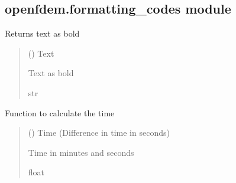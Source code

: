 \documentclass[letterpaper,10pt,english]{sphinxmanual}
\begin{document}
\subsection{openfdem.formatting\_codes module}
\label{\detokenize{openfdem:module-openfdem.formatting_codes}}\label{\detokenize{openfdem:openfdem-formatting-codes-module}}

\begin{fulllineitems}
\label{\detokenize{openfdem:openfdem.formatting_codes.bold_text}}
\pysigstartsignatures
{}
\pysigstopsignatures
\sphinxAtStartPar
Returns text as bold
\begin{quote}\begin{description}
\sphinxAtStartPar
{} () \textendash{} Text

\sphinxAtStartPar
Text as bold

\sphinxAtStartPar
str

\end{description}\end{quote}

\end{fulllineitems}


\begin{fulllineitems}
\label{\detokenize{openfdem:openfdem.formatting_codes.calc_timer_values}}
\pysigstartsignatures
{}
\pysigstopsignatures
\sphinxAtStartPar
Function to calculate the time
\begin{quote}\begin{description}
\sphinxAtStartPar
{} () \textendash{} Time (Difference in time in seconds)

\sphinxAtStartPar
Time in minutes and seconds

\sphinxAtStartPar
float

\end{description}\end{quote}

\end{fulllineitems}
\end{document}
